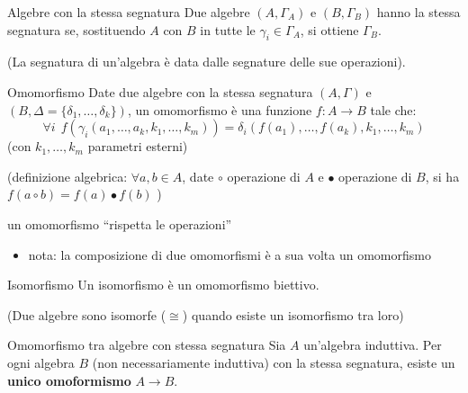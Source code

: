 \documentclass[a4paper,11pt]{report}
\begin{document}
\begin{defframe}{Algebre con la stessa segnatura}{}
    Due algebre \( (A, \Gamma_A) \) e \( (B, \Gamma_B) \) hanno la stessa segnatura se, sostituendo \( A \) con \( B \) in tutte le \( \gamma_i \in \Gamma_A \), si ottiene \( \Gamma_B \).

    (La segnatura di un'algebra è data dalle segnature delle sue operazioni).
\end{defframe}

\begin{defframe}{Omomorfismo}{}
    Date due algebre con la stessa segnatura \( (A, \Gamma) \) e \( (B, \Delta = \{\delta_1, \dots, \delta_k\} ) \), un omomorfismo è una funzione \( f: A \to B \) tale che:
    \[ \forall i \ \ f(\gamma_i (a_1, \dots, a_k, k_1, \dots, k_m)) = \delta_i (f(a_1), \dots, f(a_k), k_1, \dots, k_m)\]
    {\small(con \( k_1, \dots, k_m \) parametri esterni)}

    \vspace{0.5em}

    (definizione algebrica: \( \forall a, b \in A \), date \(\circ\) operazione di \( A \) e \(\bullet\) operazione di \( B \), si ha \( f(a \circ b) = f(a) \bullet f(b) \) )
    \vspace{0.5em}

    {\small \color{gray} un omomorfismo ``rispetta le operazioni''}

    \begin{itemize}
        \item nota: la composizione di due omomorfismi è a sua volta un omomorfismo
    \end{itemize}
\end{defframe}

\begin{defframe}{Isomorfismo}{}
    Un isomorfismo è un omomorfismo biettivo.

    (Due algebre sono isomorfe (\( \cong \)) quando esiste un isomorfismo tra loro)
\end{defframe}

\begin{thmframe}{Omomorfismo tra algebre con stessa segnatura}{}
    \label{teo-om}
    Sia \( A \) un'algebra induttiva. Per ogni algebra \( B \) (non necessariamente induttiva) con la stessa segnatura, esiste un \textbf{unico omoformismo} \( A \to B \).

\end{thmframe}
\end{document}
